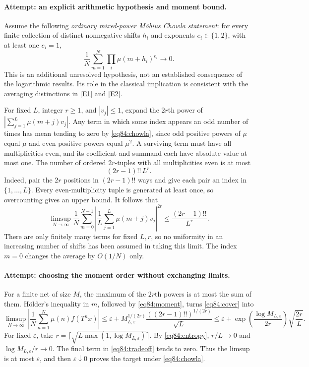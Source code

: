 \documentclass[11pt,a4paper]{article}
\numberwithin{equation}{section}
\newcommand{\eref}[2]{\hyperlink{extra:#1:#2}{[E#2]}}
\begin{document}
\paragraph{Attempt: an explicit arithmetic hypothesis and moment bound.}
Assume the following \emph{ordinary mixed-power M\"obius Chowla statement}:
for every finite collection of distinct nonnegative shifts $h_i$ and
exponents $e_i\in\{1,2\}$, with at least one $e_i=1$,
\begin{equation}\label{eq84:chowla}
 \frac1N\sum_{m=1}^N\prod_i\mu(m+h_i)^{e_i}\longrightarrow0.
\end{equation}
This is an additional unresolved hypothesis, not an established consequence
of the logarithmic results. Its role in the classical implication is
consistent with the averaging distinctions in \eref{statement}{1} and
\eref{statement}{2}.

For fixed $L$, integer $r\geq1$, and $|v_j|\leq1$, expand the $2r$th
power of $|\sum_{j=1}^L\mu(m+j)v_j|$. Any term in which some index appears
an odd number of times has mean tending to zero by \eqref{eq84:chowla},
since odd positive powers of $\mu$ equal $\mu$ and even positive powers
equal $\mu^2$. A surviving term must have all multiplicities even, and
its coefficient and summand each have absolute value at most one.
The number of ordered $2r$-tuples with all multiplicities even is at most
\[
 (2r-1)!!\,L^r.
\]
Indeed, pair the $2r$ positions in $(2r-1)!!$ ways and give each pair an
index in $\{1,\ldots,L\}$. Every even-multiplicity tuple is generated at
least once, so overcounting gives an upper bound. It follows that
\begin{equation}\label{eq84:moment}
 \limsup_{N\to\infty}\frac1N\sum_{m=0}^{N-1}
 \left|\frac1L\sum_{j=1}^L\mu(m+j)v_j\right|^{2r}
 \leq\frac{(2r-1)!!}{L^r}.
\end{equation}
There are only finitely many terms for fixed $L,r$, so no uniformity in
an increasing number of shifts has been assumed in taking this limit.
The index $m=0$ changes the average by $O(1/N)$ only.

\paragraph{Attempt: choosing the moment order without exchanging limits.}
For a finite net of size $M$, the maximum of the $2r$th powers is at most
the sum of them. H\"older's inequality in $m$, followed by
\eqref{eq84:moment}, turns \eqref{eq84:cover} into
\begin{equation}\label{eq84:tradeoff}
 \limsup_{N\to\infty}\left|\frac1N\sum_{n=1}^N
                      \mu(n)f(T^nx)\right|
 \leq\varepsilon+
 M_{L,\varepsilon}^{1/(2r)}
       \frac{((2r-1)!!)^{1/(2r)}}{\sqrt L}
 \leq\varepsilon+
 \exp\left(\frac{\log M_{L,\varepsilon}}{2r}\right)
                      \sqrt{\frac{2r}{L}}.
\end{equation}
For fixed $\varepsilon$, take
$r=\lceil\sqrt{L\max(1,\log M_{L,\varepsilon})}\rceil$.
By \eqref{eq84:entropy}, $r/L\to0$ and
$\log M_{L,\varepsilon}/r\to0$. The final term in
\eqref{eq84:tradeoff} tends to zero. Thus the limsup is at most
$\varepsilon$, and then $\varepsilon\downarrow0$ proves the target
under \eqref{eq84:chowla}.
\end{document}
